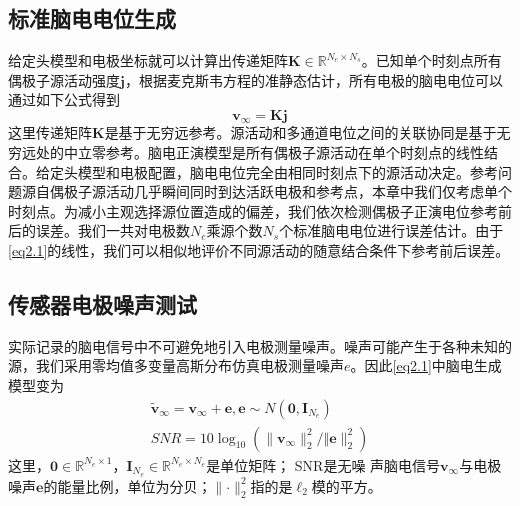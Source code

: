 \subsection{标准脑电电位生成}
给定头模型和电极坐标就可以计算出传递矩阵$\mathbf{K}\in{\mathbb{R}^{N_e\times{N_s}}}$。已知单个时刻点所有偶极子源活动强度$\mathbf{j}$，根据麦克斯韦方程的准静态估计，所有电极的脑电电位可以通过如下公式得到
\begin{equation}\label{eq2.1}
\mathbf{v}_{\infty}=\mathbf{Kj}
\end{equation}
这里传递矩阵$\mathbf{K}$是基于无穷远参考。源活动和多通道电位之间的关联协同是基于无穷远处的中立零参考。脑电正演模型是所有偶极子源活动在单个时刻点的线性结合。给定头模型和电极配置，脑电电位完全由相同时刻点下的源活动决定。参考问题源自偶极子源活动几乎瞬间同时到达活跃电极和参考点，本章中我们仅考虑单个时刻点。为减小主观选择源位置造成的偏差，我们依次检测偶极子正演电位参考前后的误差。我们一共对电极数$N_e$乘源个数$N_s$个标准脑电电位进行误差估计。由于\eqref{eq2.1}的线性，我们可以相似地评价不同源活动的随意结合条件下参考前后误差。
\subsection{传感器电极噪声测试}
实际记录的脑电信号中不可避免地引入电极测量噪声。噪声可能产生于各种未知的源，我们采用零均值多变量高斯分布仿真电极测量噪声$e$。因此\eqref{eq2.1}中脑电生成模型变为
\begin{equation}\label{eq2.2}
\begin{aligned}
\tilde{\mathbf{v}}_\infty=\mathbf{v}_{\infty}+\mathbf{e},\mathbf{e}\sim{N(\mathbf{0},\mathbf{I}_{N_e})}\\
SNR=10\log_{10}(\lVert{\mathbf{v}_\infty}\rVert_2^2/\Vert{\mathbf{e}}\rVert_2^2)
\end{aligned}
\end{equation}
这里，$\mathbf{0}\in{\mathbb{R}^{N_e\times1}}$，$\mathbf{I}_{N_e}\in{\mathbb{R}^{N_e\times{N_e}}}$是单位矩阵； SNR是无噪
声脑电信号$\mathbf{v}_{\infty}$与电极噪声$\mathbf{e}$的能量比例，单位为分贝；$\lVert{\cdot}\rVert_2^2$指的是$\ell_2$模的平方。

